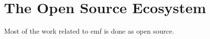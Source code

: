 \section{The Open Source Ecosystem}

Most of the work related to \acrlong{emf} is done as \gls{open source}.



